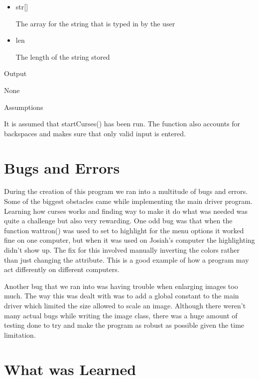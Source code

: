 \documentclass[pdftex, 11pt]{article}
\begin{document}
\begin{description}
\begin{description}
\begin{itemize}
					\item{str[]}

						The array for the string that is typed
						in by the user

					\item{len}

						The length of the string stored

				\end{itemize}

			\item{Output}

				None

			\item{Assumptions}

				It is assumed that startCurses() has been run.
				The function also accounts for backspaces and
				makes sure that only valid input is entered.

		\end{description}


\end{description}

\section{Bugs and Errors}

	During the creation of this program we ran into a multitude of bugs and errors.  Some of the biggest obstacles came
while implementing the main driver program.  Learning how curses works and finding way to make it do what was needed was
quite a challenge but also very rewarding.  One odd bug was that when the function wattron() was used to set to
highlight for the menu options it worked fine on one computer, but when it was used on Josiah's computer the
highlighting didn't show up.  The fix for this involved manually inverting the colors rather than just changing the
attribute.  This is a good example of how a program may act differently on different computers.

Another bug that we ran into was having trouble when enlarging images too much.  The way this was dealt with was to add a
global constant to the main driver which limited the size allowed to scale an image.  Although there weren't many actual
bugs while writing the image class, there was a huge amount of testing done to try and make the program as robust as
possible given the time limitation.

\section{What was Learned}
\end{document}
